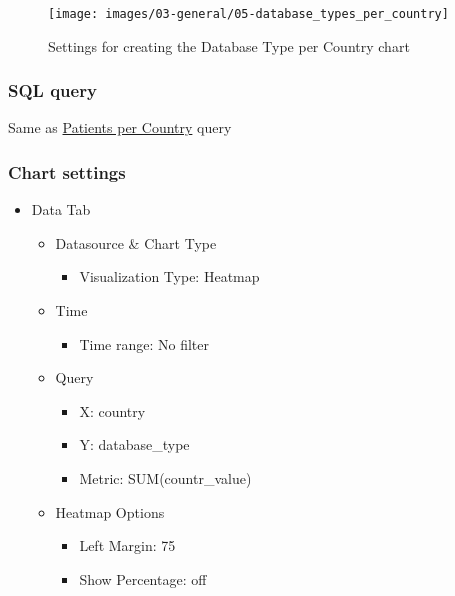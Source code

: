 \documentclass[
]{book}
\providecommand{\tightlist}{%
  \setlength{\itemsep}{0pt}\setlength{\parskip}{0pt}}
\begin{document}
\begin{figure}
\texttt{[image: images/03-general/05-database\_types\_per\_country]} \caption{Settings for creating the Database Type per Country chart}\label{fig:dbsTypesPerCountry}
\end{figure}

\hypertarget{sql-query-11}{%
\subsubsection*{SQL query}\label{sql-query-11}}

Same as \protect\hyperlink{patientsPerCountryQuery}{Patients per Country} query

\hypertarget{chart-settings-13}{%
\subsubsection*{Chart settings}\label{chart-settings-13}}

\begin{itemize}
\tightlist
\item
  Data Tab

  \begin{itemize}
  \tightlist
  \item
    Datasource \& Chart Type

    \begin{itemize}
    \tightlist
    \item
      Visualization Type: Heatmap
    \end{itemize}
  \item
    Time

    \begin{itemize}
    \tightlist
    \item
      Time range: No filter
    \end{itemize}
  \item
    Query

    \begin{itemize}
    \tightlist
    \item
      X: country
    \item
      Y: database\_type
    \item
      Metric: SUM(countr\_value)
    \end{itemize}
  \item
    Heatmap Options

    \begin{itemize}
    \tightlist
    \item
      Left Margin: 75
    \item
      Show Percentage: off
    \end{itemize}
  \end{itemize}
\end{itemize}
\end{document}

